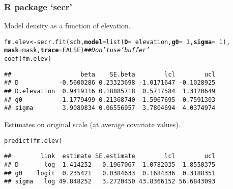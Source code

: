 \documentclass[color=usenames,dvipsnames]{beamer}\usepackage[]{graphicx}\usepackage[]{xcolor}
\makeatletter
\newcommand{\hlnum}[1]{\textcolor[rgb]{0.69,0.494,0}{#1}}%
\newcommand{\hlcom}[1]{\textcolor[rgb]{0.514,0.506,0.514}{\textit{#1}}}%
\newcommand{\hlopt}[1]{\textcolor[rgb]{0,0,0}{#1}}%
\newcommand{\hldef}[1]{\textcolor[rgb]{0,0,0}{#1}}%
\newcommand{\hlkwb}[1]{\textcolor[rgb]{0,0.341,0.682}{#1}}%
\newcommand{\hlkwc}[1]{\textcolor[rgb]{0,0,0}{\textbf{#1}}}%
\newcommand{\hlkwd}[1]{\textcolor[rgb]{0.004,0.004,0.506}{#1}}%
\newenvironment{kframe}{%
 \def\at@end@of@kframe{}%
 \ifinner\ifhmode%
  \def\at@end@of@kframe{\end{minipage}}%
  \begin{minipage}{\columnwidth}%
 \fi\fi%
 \def\FrameCommand##1{\hskip\@totalleftmargin \hskip-\fboxsep
 \colorbox{shadecolor}{##1}\hskip-\fboxsep
     \hskip-\linewidth \hskip-\@totalleftmargin \hskip\columnwidth}%
 \MakeFramed {\advance\hsize-\width
   \@totalleftmargin\z@ \linewidth\hsize
   \@setminipage}}%
 {\par\unskip\endMakeFramed%
 \at@end@of@kframe}
\newenvironment{knitrout}{}{} %
\let\hlstd\hldef
\makeatother
\begin{document}
\begin{frame}[fragile]
  \frametitle{R package `secr'}
  Model density as a function of elevation. 
\begin{knitrout}\scriptsize
{}\color{fgcolor}\begin{kframe}
\begin{alltt}
\hlstd{fm.elev} \hlkwb{<-} \hlkwd{secr.fit}\hlstd{(sch,} \hlkwc{model}\hlstd{=}\hlkwd{list}\hlstd{(}\hlkwc{D}\hlstd{=}\hlopt{~}\hlstd{elevation,} \hlkwc{g0}\hlstd{=}\hlopt{~}\hlnum{1}\hlstd{,} \hlkwc{sigma}\hlstd{=}\hlopt{~}\hlnum{1}\hlstd{),}
                    \hlkwc{mask}\hlstd{=mask,} \hlkwc{trace}\hlstd{=}\hlnum{FALSE}\hlstd{)}  \hlcom{## Don't use 'buffer'}
\hlkwd{coef}\hlstd{(fm.elev)}
\end{alltt}
\begin{verbatim}
##                   beta    SE.beta        lcl        ucl
## D           -0.5600286 0.23323698 -1.0171647 -0.1028925
## D.elevation  0.9419116 0.18885718  0.5717584  1.3120649
## g0          -1.1779499 0.21368740 -1.5967695 -0.7591303
## sigma        3.9089834 0.06556957  3.7804694  4.0374974
\end{verbatim}
\end{kframe}
\end{knitrout}
\pause
\vfill
Estimates on original scale (at average covariate values).
\begin{knitrout}\scriptsize
{}\color{fgcolor}\begin{kframe}
\begin{alltt}
\hlkwd{predict}\hldef{(fm.elev)}
\end{alltt}
\begin{verbatim}
##        link  estimate SE.estimate        lcl        ucl
## D       log  1.414252   0.1967067  1.0782035  1.8550375
## g0    logit  0.235421   0.0384633  0.1684336  0.3188351
## sigma   log 49.848252   3.2720450 43.8366152 56.6843093
\end{verbatim}
\end{kframe}
\end{knitrout}
\end{frame}
\end{document}
